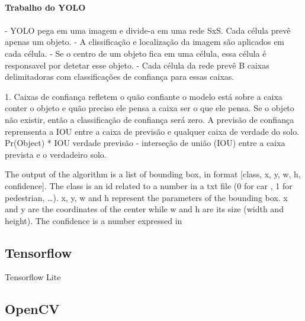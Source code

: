 \paragraph{Trabalho do YOLO}
\paragraph{}

- YOLO pega em uma imagem e divide-a em uma rede SxS. Cada célula prevê apenas um objeto.
- A clissificação e localização da imagem são aplicados em cada célula.
- Se o centro de um objeto fica em uma célula, essa célula é responsavel por detetar esse objeto.
- Cada célula da rede prevê B caixas delimitadoras com classificações de confiança para essas caixas.

1. Caixas de confiança refletem o quão confiante o modelo está sobre a caixa conter o objeto e quão preciso ele pensa a caixa ser o que ele pensa. Se o objeto não existir, então a classificação de confiança será zero. 
\newline
A previsão de confiança reprensenta a IOU entre a caixa de previsão e qualquer caixa de verdade do solo.
Pr(Object) * IOU verdade previsão - interseção de união (IOU) entre a caixa prevista e o verdadeiro solo.







The output of the algorithm is a list of bounding box, in format [class, x, y, w, h, confidence]. The class is an id related to a number in a txt file (0 for car , 1 for pedestrian, …). x, y, w and h represent the parameters of the bounding box. x and y are the coordinates of the center while w and h are its size (width and height). The confidence is a number expressed in %

\subsection{Tensorflow}
\label{chap2:subsec:tensorflow}

Tensorflow Lite


\subsection{OpenCV}
\label{chap2:subsec:opencv}
\paragraph{}

